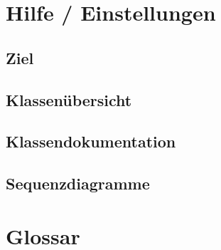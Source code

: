 \documentclass[parskip=full]{scrartcl}
\begin{document}
\clearpage
\section{Hilfe / Einstellungen}

\subsection{Ziel}

\subsection{Klassenübersicht}

\subsection{Klassendokumentation}

\subsection{Sequenzdiagramme}

\clearpage
\section{Glossar}\label{glossar}

\renewcommand*{\glossarysection}[2][]{}	%
\printnoidxglossaries				%
\end{document}
